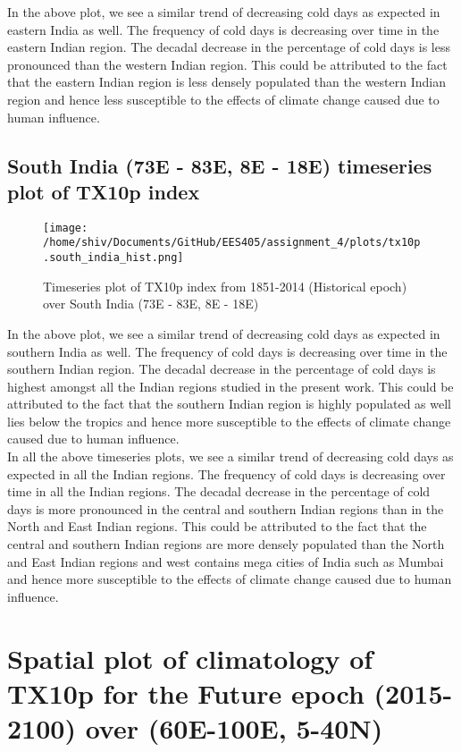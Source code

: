 \documentclass[a4paper, 12pt, twoside]{report}
\begin{document}
In the above plot, we see a similar trend of decreasing cold days as expected in eastern India as well. The frequency of cold days is decreasing over time in the eastern Indian region. The decadal decrease in the percentage of cold days is less pronounced than the western Indian region. This could be attributed to the fact that the eastern Indian region is less densely populated than the western Indian region and hence less susceptible to the effects of climate change caused due to human influence.

\newpage

\subsection{South India (73E - 83E, 8E - 18E) timeseries plot of TX10p index}

\begin{figure}[h]
    \centering
    \texttt{[image: /home/shiv/Documents/GitHub/EES405/assignment\_4/plots/tx10p.south\_india\_hist.png]}
    \caption{\centering Timeseries plot of TX10p index from 1851-2014 (Historical epoch) over South India (73E - 83E, 8E - 18E)}
    \label{fig:TX10p_timeseries_south_india}
\end{figure}

In the above plot, we see a similar trend of decreasing cold days as expected in southern India as well. The frequency of cold days is decreasing over time in the southern Indian region. The decadal decrease in the percentage of cold days is highest amongst all the Indian regions studied in the present work. This could be attributed to the fact that the southern Indian region is highly populated as well lies below the tropics and hence more susceptible to the effects of climate change caused due to human influence. \\
In all the above timeseries plots, we see a similar trend of decreasing cold days as expected in all the Indian regions. The frequency of cold days is decreasing over time in all the Indian regions. The decadal decrease in the percentage of cold days is more pronounced in the central and southern Indian regions than in the North and East Indian regions. This could be attributed to the fact that the central and southern Indian regions are more densely populated than the North and East Indian regions and west contains mega cities of India such as Mumbai and hence more susceptible to the effects of climate change caused due to human influence.

\section{Spatial plot of climatology of TX10p for the Future epoch (2015-2100) over (60E-100E, 5-40N)}
\end{document}
